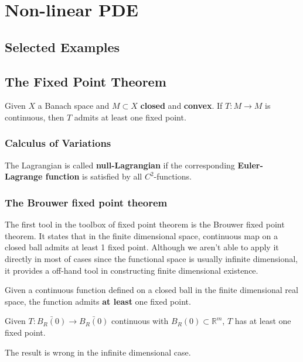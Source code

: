 \chapter{Non-linear PDE}
\section{Selected Examples}


\section{The Fixed Point Theorem}
\begin{theorem}
Given $X$ a Banach space and $M \subset X$ \textbf{closed} and \textbf{convex}. If $T : M \rightarrow M$ is continuous, then $T$ admits at least one fixed point. 	
\end{theorem}


\subsection{Calculus of Variations}
\begin{definition}
	The Lagrangian is called \textbf{null-Lagrangian} if the corresponding \textbf{Euler-Lagrange function} is satisfied by all $C^2$-functions.
\end{definition}


\subsection{The Brouwer fixed point theorem}
The first tool in the toolbox of fixed point theorem is the Brouwer fixed point theorem. It states that in the finite dimensional space, continuous map on a closed ball admits at least 1 fixed point. Although we aren't able to apply it directly in most of cases since the functional space is usually infinite dimensional, it provides a off-hand tool in constructing finite dimensional existence. 

\begin{theorem}
	Given a continuous function defined on a closed ball in the finite dimensional real space, the function admits \textbf{at least} one fixed point. \par 
	Given $T: \bar{B_R(0)} \rightarrow \bar{B_R(0)}$ continuous with $B_R(0) \subset \mathbb{R}^m$, $T$ has at least one fixed point. 
\end{theorem}
\begin{remark}
The result is wrong in the infinite dimensional case. 	
\end{remark}

